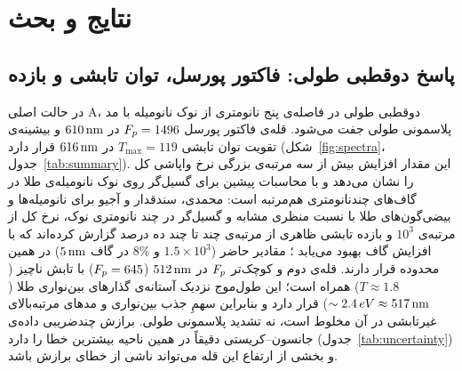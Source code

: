 \section{نتایج و بحث}
\label{sec:results}

\subsection{پاسخ دوقطبی طولی: فاکتور پورسل، توان تابشی و بازده}
\label{sec:results-purcell}

در حالت اصلی A، دوقطبی طولی در فاصله‌ی پنج نانومتری از نوک نانومیله با مد
پلاسمونی طولی جفت می‌شود. قله‌ی فاکتور پورسل $F_p = 1496$ در $610\,\text{nm}$
و بیشینه‌ی تقویت توان تابشی $T_{\max} = 119$ در $616\,\text{nm}$ قرار دارد
(شکل~\ref{fig:spectra}، جدول~\ref{tab:summary}). این مقدار افزایش بیش از
سه مرتبه‌ی بزرگی نرخ واپاشی کل را نشان می‌دهد و با محاسبات پیشین برای
گسیل‌گر روی نوک نانومیله‌ی طلا در گاف‌های چندنانومتری هم‌مرتبه است:
محمدی، سندقدار و آجیو برای نانومیله‌ها و بیضی‌گون‌های طلا با نسبت منظری
مشابه و گسیل‌گر در چند نانومتری نوک، نرخ کل از مرتبه‌ی $10^{3}$ و بازده
تابشی ظاهری از مرتبه‌ی چند تا چند ده درصد گزارش کرده‌اند که با افزایش گاف بهبود
می‌یابد \cite{mohammadi2008gold}؛ مقادیر حاضر ($1.5\times10^{3}$ و
$8\%$ در گاف $5\,\text{nm}$) در همین محدوده قرار دارند. قله‌ی دوم و کوچک‌تر $F_p$ در $512\,\text{nm}$
($F_p = 645$) با تابش ناچیز ($T \approx 1.8$) همراه است؛ این طول‌موج نزدیک آستانه‌ی گذارهای بین‌نواری طلا
($\sim2.4\,eV \approx 517\,\text{nm}$) قرار دارد و بنابراین سهمِ جذب بین‌نواری و مدهای مرتبه‌بالای غیرتابشی در آن
مخلوط است، نه تشدید پلاسمونی طولی. برازش چندضریبی داده‌ی جانسون–کریستی دقیقاً در همین ناحیه بیشترین خطا را دارد
(جدول~\ref{tab:uncertainty}) و بخشی از ارتفاع این قله می‌تواند ناشی از خطای برازش باشد.

